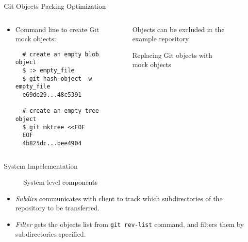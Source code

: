 \documentclass[final]{beamer}
\begin{document}
\begin{frame}[t, fragile]
\begin{columns}[t]
\begin{column}{.5\linewidth}
\begin{block}{Git Objects Packing Optimization}
\begin{columns}[T]
\begin{column}{.5\textwidth}
\begin{itemize}
\item Command line to create Git mock objects:
\begin{verbatim}
  # create an empty blob object
  $ :> empty_file
  $ git hash-object -w empty_file
  e69de29...48c5391

  # create an empty tree object
  $ git mktree <<EOF
  EOF
  4b825dc...bee4904
\end{verbatim}
\end{itemize}
\end{column}
          \begin{column}{.5\textwidth}
              \begin{figure} \centering
                \caption{Objects can be excluded in the example repository}
                \label{fig:find-obj-to-remove}
              \end{figure}
              \begin{figure} \centering
                \caption{Replacing Git objects with mock objects}
                \label{fig:mock-objects}
              \end{figure}
            \end{column}
\end{columns}
      \end{block}
      \begin{block}{System Impelementation}
              \begin{figure} \centering
                \caption{System level components}
              \end{figure}
\begin{itemize}
    \justifying
  \item \emph{Subdirs} communicates with client to track which subdirectories
    of the repository to be transferred.

  \item \emph{Filter} gets the objects list from
    \verb|git rev-list| command, and filters them by subdirectories specified.


\end{itemize}
\end{block}
\end{column}
\end{columns}
\end{frame}
\end{document}
